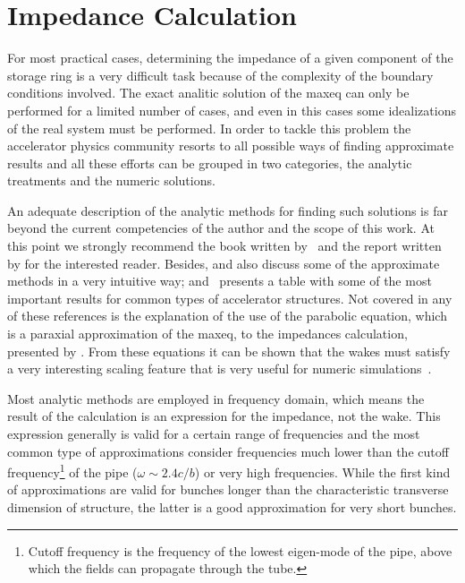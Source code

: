 \section{Impedance Calculation}

    For most practical cases, determining the impedance of a given component of the storage ring is a very difficult task because of the complexity of the boundary conditions involved. The exact analitic solution of the \gls{maxeq} can only be performed for a limited number of cases, and even in this cases some idealizations of the real system must be performed. In order to tackle this problem the accelerator physics community resorts to all possible ways of finding approximate results and all these efforts can be grouped in two categories, the analytic treatments and the numeric solutions.

	An adequate description of the analytic methods for finding such solutions is far beyond the current competencies of the author and the scope of this work. At this point we strongly recommend the book written by~ and the report written by  for the interested reader. Besides,  and  also discuss some of the approximate methods in a very intuitive way; and~ presents a table with some of the most important results for common types of accelerator structures. Not covered in any of these references is the explanation of the use of the parabolic equation, which is a paraxial approximation of the \gls{maxeq}, to the impedances calculation, presented by . From these equations it can be shown that the wakes must satisfy a very interesting scaling feature that is very useful for numeric simulations~\cite{stupakov2011}.

    Most analytic methods are employed in frequency domain, which means the result of the calculation is an expression for the impedance, not the wake. This expression generally is valid for a certain range of frequencies and the most common type of approximations consider frequencies much lower than the cutoff frequency\footnote{Cutoff frequency is the frequency of the lowest eigen-mode of the pipe, above which the fields can propagate through the tube.} of the pipe ($\omega\sim2.4c/b$) or very high frequencies. While the first kind of approximations are valid for bunches longer than the characteristic transverse dimension of structure, the latter is a good approximation for very short bunches.

